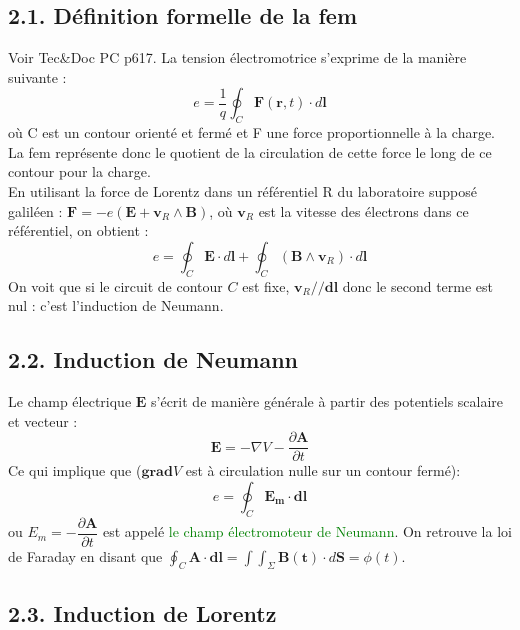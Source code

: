 \documentclass[french, a4paper, 10pt, twocolumn, landscape]{article}
\begin{document}
\subsection*{2.1. Définition formelle de la fem}

Voir Tec\&Doc PC p617. La tension électromotrice s'exprime de la manière suivante :
\begin{equation}
    e = \frac{1}{q} \oint_{C} \mathbf{F}(\mathbf{r}, t) \cdot d\mathbf{l}
\end{equation}
où C est un contour orienté et fermé et F une force proportionnelle à la charge. La fem représente donc le quotient de la circulation de cette force le long de ce contour pour la charge.\\ 
En utilisant la force de Lorentz dans un référentiel R du laboratoire supposé galiléen : $\mathbf F = -e(\mathbf{E}+\mathbf{v}_R\wedge \mathbf{B})$, où $\mathbf{v}_R$ est la vitesse des électrons dans ce référentiel, on obtient : 
\begin{equation}
    e = \oint_{C} \mathbf{E} \cdot d \mathbf{l} + \oint_C (\mathbf{B} \land \mathbf{v}_R) \cdot d \mathbf{l}
\end{equation}
On voit que si le circuit de contour $C$ est fixe, $\mathbf{v}_R//\mathbf{dl}$ donc le second terme est nul : c'est l'induction de Neumann.

\subsection*{2.2. Induction de Neumann}

Le champ électrique $\mathbf{E}$ s'écrit de manière générale à partir des potentiels scalaire et vecteur :
\begin{equation}
    \mathbf{E} = - \nabla V - \frac{\partial \mathbf{A}}{\partial t}
\end{equation}
Ce qui implique que ($\mathbf{grad}V$ est à circulation nulle sur un contour fermé):
\begin{equation}
    e = \oint_C \mathbf{E_m}\cdot \mathbf{dl}
\end{equation}
ou $E_m = -\dfrac{\partial \mathbf{A}}{\partial t}$ est appelé \textcolor{green}{le champ électromoteur de Neumann}. On retrouve la loi de Faraday en disant que $\oint_C \mathbf{A}\cdot\mathbf{dl}=\int\int_\Sigma \mathbf{B(t)}\cdot d\mathbf{S}=\phi(t)$.
 


\subsection*{2.3. Induction de Lorentz}
\end{document}
